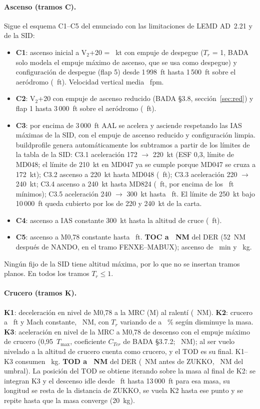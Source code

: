 \documentclass[11pt,a4paper]{article}
\DeclareRobustCommand{\m}[1]{{\ttfamily\def\_{\textunderscore\penalty100\relax}#1}}
\begin{document}
\paragraph{Ascenso (tramos C).} Sigue el esquema C1--C5 del enunciado con las limitaciones de LEMD AD~2.21 y de la SID:
\begin{itemize}
\item \textbf{C1}: ascenso inicial a V$_2$+20 = \vVIIpIIO~kt con empuje de despegue ($T_r$ = 1, BADA solo modela el empuje máximo de ascenso, que se usa como despegue) y configuración de despegue (flap 5) desde 1\,998~ft hasta 1\,500~ft sobre el aeródromo (\vCItop~ft). Velocidad vertical media \vVSCI~fpm.
\item \textbf{C2}: V$_2$+20 con empuje de ascenso reducido (BADA §3.8, sección~\ref{sec:red}) y flap 1 hasta 3\,000~ft sobre el aeródromo (\vCIItop~ft).
\item \textbf{C3}: por encima de 3\,000~ft AAL se acelera y asciende respetando las IAS máximas de la SID, con el empuje de ascenso reducido y configuración limpia. \m{build\_profile} genera automáticamente los subtramos a partir de los límites de la tabla de la SID: C3.1 aceleración 172 $\rightarrow$ 220~kt (ESF 0,3, límite de MD048; el límite de 210~kt en MD047 ya se cumple porque MD047 se cruza a 172~kt); C3.2 ascenso a 220~kt hasta MD048 (\vMDOIVVIIIh~ft); C3.3 aceleración 220 $\rightarrow$ 240~kt; C3.4 ascenso a 240~kt hasta MD824 (\vMDVIIIIIIVh~ft, por encima de los \sidMDVIIIIIIValt~ft mínimos); C3.5 aceleración 240 $\rightarrow$ 300~kt hasta \vCIIIVh~ft. El límite de 250~kt bajo 10\,000~ft queda cubierto por los de 220 y 240~kt de la carta.
\item \textbf{C4}: ascenso a IAS constante 300~kt hasta la altitud de cruce (\vHcrossClb~ft).
\item \textbf{C5}: ascenso a M0,78 constante hasta \vHcru~ft. \textbf{TOC a \vTOC~NM} del DER (52~NM después de NANDO, en el tramo FENXE--MABUX); ascenso de \vTclb~min y \vFuelClb~kg.
\end{itemize}
Ningún fijo de la SID tiene altitud máxima, por lo que no se insertan tramos planos. En todos los tramos $T_r \le 1$.

\paragraph{Crucero (tramos K).} \textbf{K1}: deceleración en nivel de M0,78 a la MRC (M\vMcru) al ralentí (\vKIlen~NM). \textbf{K2}: crucero a \vHcru~ft y Mach constante, \vCruiseLen~NM, con $T_r$ variando de \vTrKIIini{} a \vTrKIIfin~\% según disminuye la masa. \textbf{K3}: aceleración en nivel de la MRC a M0,78 de descenso con el empuje máximo de crucero (0,95~$T_{\max}$, coeficiente $C_{Tcr}$ de BADA §3.7.2; \vKIIIlen~NM); al ser vuelo nivelado a la altitud de crucero cuenta como crucero, y el TOD es su final. K1--K3 consumen \vFuelCru~kg. \textbf{TOD a \vTOD~NM} del DER (\vTODzukko~NM antes de ZUKKO, \vDesLen~NM del umbral). La posición del TOD se obtiene iterando sobre la masa al final de K2: se integran K3 y el descenso idle desde \vHcru~ft hasta 13\,000~ft para esa masa, su longitud se resta de la distancia de ZUKKO, se vuela K2 hasta ese punto y se repite hasta que la masa converge (20~kg).
\end{document}
